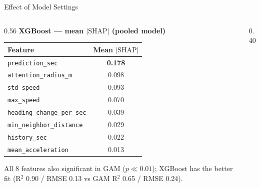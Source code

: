 \begin{frame}[t]{Effect of Model Settings}
  \small
  \vspace{0.1em}
  \begin{columns}[t]
    \begin{column}{0.56\textwidth}
      \centering
      \textbf{XGBoost — mean $|\mathrm{SHAP}|$ (pooled model)}
      \vspace{0.3em}
      \renewcommand{\arraystretch}{1.2}
      \begin{tabular}{lc}
        \toprule
        \textbf{Feature} & \textbf{Mean $|\mathrm{SHAP}|$} \\
        \midrule
        \texttt{prediction\_sec}            & \textbf{0.178} \\
        \texttt{attention\_radius\_m}       & 0.098 \\
        \texttt{std\_speed}                 & 0.093 \\
        \texttt{max\_speed}                 & 0.070 \\
        \texttt{heading\_change\_per\_sec}  & 0.039 \\
        \texttt{min\_neighbor\_distance}    & 0.029 \\
        \texttt{history\_sec}               & 0.022 \\
        \texttt{mean\_acceleration}         & 0.013 \\
        \bottomrule
      \end{tabular}
      \vspace{0.3em}

      \footnotesize All 8 features also significant in GAM ($p \ll 0.01$);
      XGBoost has the better fit
      (R$^2$ 0.90 / RMSE 0.13 vs GAM R$^2$ 0.65 / RMSE 0.24).
    \end{column}
    \begin{column}{0.40\textwidth}
    \end{column}
  \end{columns}
\end{frame}

